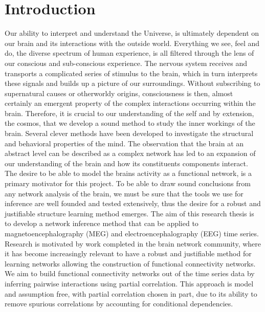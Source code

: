 \documentclass[11pt]{article}
\begin{document}
\section{Introduction}
Our ability to interpret and understand the Universe, is ultimately dependent on our brain and its interactions with the outside world. Everything we see, feel and do, the diverse spectrum of human experience, is all filtered through the lens of our conscious and sub-conscious experience. The nervous system receives and transports a complicated series of stimulus to the brain, which in turn interprets these signals and builds up a picture of our surroundings. Without subscribing to supernatural causes or otherworldy origins, consciousness is then, almost certainly an emergent property of the complex interactions occurring within the brain. Therefore, it is crucial to our understanding of the self and by extension, the cosmos, that we develop a sound method to study the inner workings of the brain. Several clever methods have been developed to investigate the structural and behavioral properties of the mind. The observation that the brain at an abstract level can be described as a complex network has led to an expansion of our understanding of the brain and how its constituents components interact. The desire to be able to model the brains activity as a functional network, is a primary motivator for this project. To be able to draw sound conclusions from any network analysis of the brain, we must be sure that the tools we use for inference are well founded and tested extensively, thus the desire for a robust and justifiable structure learning method emerges. The aim of this research thesis is to develop a network inference method that can be applied to magnetoencephalography (MEG) and electroencephalography (EEG) time series. Research is motivated by work completed in the brain network community, where it has become increasingly relevant to have a robust and justifiable method for learning networks allowing the construction of functional connectivity networks. We aim to build functional connectivity networks out of the time series data by inferring pairwise interactions using partial correlation. This approach is model and assumption free, with partial correlation chosen in part, due to its ability to remove spurious correlations by accounting for conditional dependencies.
\end{document}
